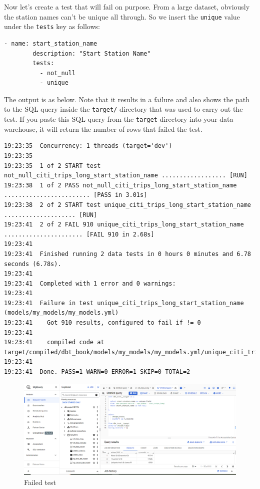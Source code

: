 \documentclass[
]{book}
\begin{document}
Now let's create a test that will fail on purpose. From a large dataset, obviously the station names can't be unique all through. So we insert the \texttt{unique} value under the \texttt{tests} key as follows:

\begin{verbatim}
- name: start_station_name
        description: "Start Station Name"
        tests:
          - not_null
          - unique
\end{verbatim}

The output is as below. Note that it results in a failure and also shows the path to the SQL query inside the \texttt{target/} directory that was used to carry out the test. If you paste this SQL query from the \texttt{target} directory into your data warehouse, it will return the number of rows that failed the test.

\begin{verbatim}
19:23:35  Concurrency: 1 threads (target='dev')
19:23:35  
19:23:35  1 of 2 START test not_null_citi_trips_long_start_station_name .................. [RUN]
19:23:38  1 of 2 PASS not_null_citi_trips_long_start_station_name ........................ [PASS in 3.01s]
19:23:38  2 of 2 START test unique_citi_trips_long_start_station_name .................... [RUN]
19:23:41  2 of 2 FAIL 910 unique_citi_trips_long_start_station_name ...................... [FAIL 910 in 2.68s]
19:23:41  
19:23:41  Finished running 2 data tests in 0 hours 0 minutes and 6.78 seconds (6.78s).
19:23:41  
19:23:41  Completed with 1 error and 0 warnings:
19:23:41  
19:23:41  Failure in test unique_citi_trips_long_start_station_name (models/my_models/my_models.yml)
19:23:41    Got 910 results, configured to fail if != 0
19:23:41  
19:23:41    compiled code at target/compiled/dbt_book/models/my_models/my_models.yml/unique_citi_trips_long_start_station_name.sql
19:23:41  
19:23:41  Done. PASS=1 WARN=0 ERROR=1 SKIP=0 TOTAL=2
\end{verbatim}

\begin{figure}
\centering
\includegraphics{./images/failed_test.png}
\caption{Failed test}
\end{figure}
\end{document}
